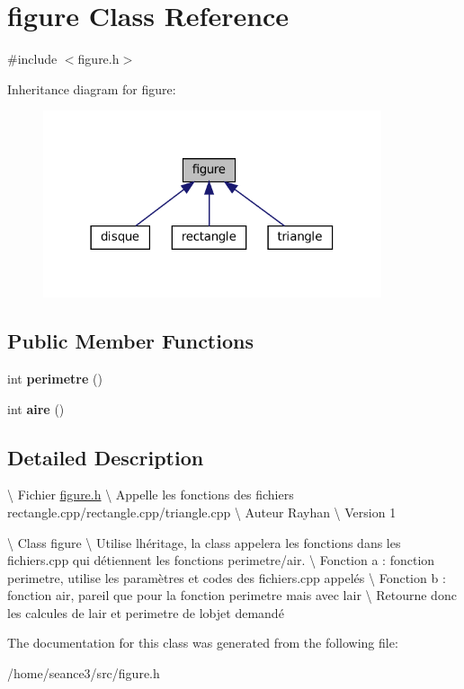 \hypertarget{classfigure}{}\section{figure Class Reference}
\label{classfigure}


{\ttfamily \#include $<$figure.\+h$>$}



Inheritance diagram for figure\+:
\nopagebreak
\begin{figure}[H]
\begin{center}
\leavevmode
\includegraphics[width=282pt]{classfigure__inherit__graph}
\end{center}
\end{figure}
\subsection*{Public Member Functions}
\begin{DoxyCompactItemize}
\item 
\mbox{\label{classfigure_a6ad51de31732e21f412ee7482e688ed0}} 
int {\bfseries perimetre} ()
\item 
\mbox{\label{classfigure_a28b97e5819bec4048e69ecfe8a19043a}} 
int {\bfseries aire} ()
\end{DoxyCompactItemize}


\subsection{Detailed Description}
\textbackslash{} Fichier \hyperlink{figure_8h_source}{figure.\+h} \textbackslash{} Appelle les fonctions des fichiers rectangle.\+cpp/rectangle.cpp/triangle.\+cpp \textbackslash{} Auteur Rayhan \textbackslash{} Version 1

\textbackslash{} Class figure \textbackslash{} Utilise l\textquotesingle{}héritage, la class appelera les fonctions dans les fichiers.\+cpp qui détiennent les fonctions perimetre/air. \textbackslash{} Fonction a \+: fonction perimetre, utilise les paramètres et codes des fichiers.\+cpp appelés \textbackslash{} Fonction b \+: fonction air, pareil que pour la fonction perimetre mais avec l\textquotesingle{}air \textbackslash{} Retourne donc les calcules de l\textquotesingle{}air et perimetre de l\textquotesingle{}objet demandé 

The documentation for this class was generated from the following file\+:\begin{DoxyCompactItemize}
\item 
/home/seance3/src/figure.\+h\end{DoxyCompactItemize}
